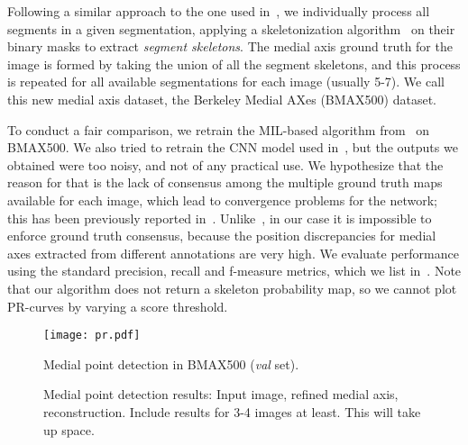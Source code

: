 \documentclass[10pt,twocolumn,letterpaper]{article}
\begin{document}
Following a similar approach to the one used in~\cite{tsogkas2012learning,shen2016object}, 
we individually process all segments in a given segmentation, applying a skeletonization 
algorithm~\cite{telea2002augmented} on their binary masks to extract \emph{segment skeletons}.
The medial axis ground truth for the image is formed by taking the union of all the segment skeletons, and this
process is repeated for all available segmentations for each image (usually 5-7).
We call this new medial axis dataset, the Berkeley Medial AXes (BMAX500) dataset.

To conduct a fair comparison, we retrain the MIL-based algorithm from~\cite{tsogkas2012learning} on BMAX500.
We also tried to retrain the CNN model used in~\cite{shen2016object}, but the outputs we obtained were too noisy, 
and not of any practical use.
We hypothesize that the reason for that is the lack of consensus among the multiple ground truth maps
available for each image, which lead to convergence problems for the network; this has been previously
reported in~\cite{xie2015holistically}.
Unlike~\cite{xie2015holistically}, in our case it is impossible to enforce ground truth consensus,
because the position discrepancies for medial axes extracted from different annotations are very high.
We evaluate performance using the standard precision, recall and f-measure metrics, 
which we list in~.
Note that our algorithm does not return a skeleton probability map, so we cannot 
plot PR-curves by varying a score threshold.


\begin{figure}
\centering
\texttt{[image: pr.pdf]}
\caption{Medial point detection in BMAX500 (\emph{val} set).}
\label{fig:experiments:detection:pr}
\end{figure}

\begin{figure}[t]
\centering
\caption{Medial point detection results: Input image, refined medial axis, reconstruction. 
Include results for 3-4 images at least. This will take up space.}
\label{fig:experiments:detection:examples}
\end{figure}
\end{document}
